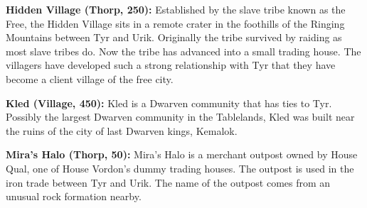 {
	\textbf{Hidden Village (Thorp, 250):} Established by the slave tribe known as the Free, the Hidden Village sits in a remote crater in the foothills of the Ringing Mountains between Tyr and Urik. Originally the tribe survived by raiding as most slave tribes do. Now the tribe has advanced into a small trading house. The villagers have developed such a strong relationship with Tyr that they have become a client village of the free city.

	\textbf{Kled (Village, 450):} Kled is a Dwarven community that has ties to Tyr. Possibly the largest Dwarven community in the Tablelands, Kled was built near the ruins of the city of last Dwarven kings, Kemalok.

	\textbf{Mira’s Halo (Thorp, 50):} Mira’s Halo is a merchant outpost owned by House Qual, one of House Vordon’s dummy trading houses. The outpost is used in the iron trade between Tyr and Urik. The name of the outpost comes from an unusual rock formation nearby.
}
